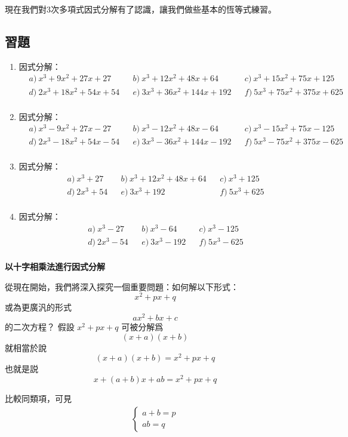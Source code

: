 \documentclass[12pt]{article}
\begin{document}
    現在我們對3次多項式因式分解有了認識，讓我們做些基本的恆等式練習。

    \subsection*{習題}
    \begin{enumerate}
        \item 因式分解：\begin{align*}
            &a)\ x^3+9x^2+27x+27&&b)\ x^3+12x^2+48x+64&&c)\ x^3+15x^2+75x+125\\
            &d)\ 2x^3+18x^2+54x+54&&e)\ 3x^3+36x^2+144x+192&&f)\ 5x^3+75x^2+375x+625\\
        \end{align*}
        \item 因式分解：\begin{align*}
            &a)\ x^3-9x^2+27x-27&&b)\ x^3-12x^2+48x-64&&c)\ x^3-15x^2+75x-125\\
            &d)\ 2x^3-18x^2+54x-54&&e)\ 3x^3-36x^2+144x-192&&f)\ 5x^3-75x^2+375x-625\\
        \end{align*}
        \item 因式分解：\begin{align*}
            &a)\ x^3+27&&b)\ x^3+12x^2+48x+64&&c)\ x^3+125\\
            &d)\ 2x^3+54&&e)\ 3x^3+192&&f)\ 5x^3+625\\
        \end{align*}
        \item 因式分解：\begin{align*}
            &a)\ x^3-27&&b)\ x^3-64&&c)\ x^3-125\\
            &d)\ 2x^3-54&&e)\ 3x^3-192&&f)\ 5x^3-625\\
        \end{align*}
    \end{enumerate}

    \begin{center}
        \textbf{以十字相乘法進行因式分解}
    \end{center}

    從現在開始，我們將深入探究一個重要問題：如何解以下形式： $$x^2+px+q$$ 或為更廣汎的形式 $$ax^2+bx+c$$ 的二次方程？ 假設 $x^2+px+q$ 可被分解爲 $$(x+a)(x+b)$$ 就相當於說 $$(x+a)(x+b)=x^2+px+q$$ 也就是説 $$x+(a+b)x+ab=x^2+px+q$$

    比較同類項，可見 \begin{align*}
        \begin{cases}
            a+b=p\\
            ab=q
        \end{cases}
    \end{align*}
\end{document}
